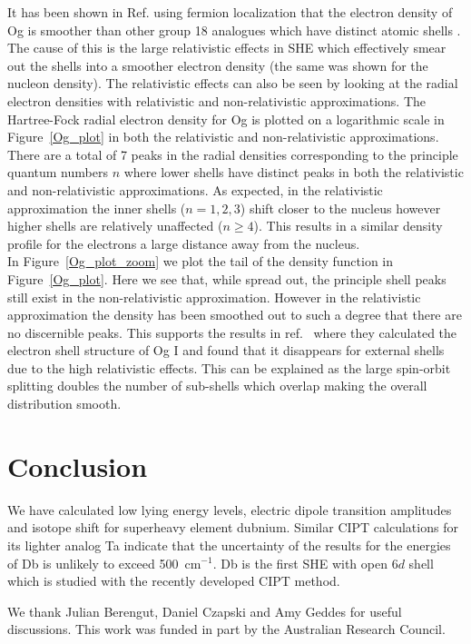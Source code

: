 \documentclass[8pt,a4paper, twoside]{report}
\begin{document}
It has been shown in Ref. \cite{Jerabek2018} using fermion localization that the electron density of Og is smoother than other group 18 analogues which have distinct atomic shells . The cause of this is the large relativistic effects in SHE which effectively smear out the shells into a smoother electron density (the same was shown for the nucleon density). The relativistic effects can also be seen by looking at the radial electron densities with relativistic and non-relativistic approximations. The Hartree-Fock radial electron density for Og is plotted on a logarithmic scale in Figure~\ref{Og_plot} in both the relativistic and non-relativistic approximations. There are a total of 7 peaks in the radial densities corresponding to the principle quantum numbers $n$ where lower shells have distinct peaks in both the relativistic and non-relativistic approximations. As expected, in the relativistic approximation the inner shells ($n=1,2,3$) shift closer to the nucleus however higher shells are relatively unaffected ($n \geq 4$). This results in a similar density profile for the electrons a large distance away from the nucleus. \\

In Figure~\ref{Og_plot_zoom} we plot the tail of the density function in Figure~\ref{Og_plot}. Here we see that, while spread out, the principle shell peaks still exist in the non-relativistic approximation. However in the relativistic approximation the density has been smoothed out to such a degree that there are no discernible peaks. This supports the results in ref.~\cite{Jerabek2018} where they calculated the electron shell structure of Og I and found that it disappears for external shells due to the high relativistic effects. This can be explained as the large spin-orbit splitting doubles the number of sub-shells which overlap making the overall distribution smooth.\\

\chapter{Conclusion}
We have calculated low lying energy levels, electric dipole transition amplitudes and isotope shift for superheavy element
dubnium. Similar CIPT calculations for its lighter analog Ta indicate that the uncertainty of the results for the energies of 
Db is unlikely to exceed 500~cm$^{-1}$. Db is the first SHE with open $6d$ shell which is studied with the recently
developed CIPT method. 

We thank Julian Berengut, Daniel Czapski and Amy Geddes for useful discussions.
This work was funded in part by the Australian Research Council.
\end{document}
